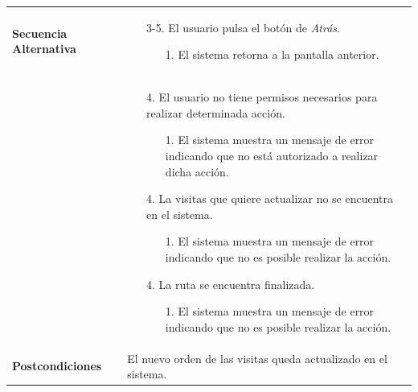 \begin{longtable}{| p{4cm} | p{10cm} |}
\\
\hline
\textbf{Secuencia Alternativa} &\mbox{}\par\vspace{-\baselineskip}
\begin{enumerate}[leftmargin=0.9cm, topsep=0.1cm]
\item[3-5.] El usuario pulsa el botón de \textit{Atrás}.
	\begin{itemize}
	\item[1.] El sistema retorna a la pantalla anterior.
	\end{itemize}
\end{enumerate}
\\ &\mbox{}\par\vspace{-\baselineskip}	
\begin{enumerate}[leftmargin=0.7cm, topsep=0.1cm]
\item[4.] El usuario no tiene permisos necesarios para realizar determinada acción.
	\begin{itemize}
	\item[1.] El sistema muestra un mensaje de error indicando que no está autorizado a realizar dicha acción.
	\end{itemize}
\item[4.] La visitas que quiere actualizar no se encuentra en el sistema.
	\begin{itemize}
	\item[1.] El sistema muestra un mensaje de error indicando que no es posible realizar la acción.
	\end{itemize}
\item[4.] La ruta se encuentra finalizada.
	\begin{itemize}
	\item[1.] El sistema muestra un mensaje de error indicando que no es posible realizar la acción.
	\end{itemize}
\end{enumerate}
\\

\hline
\textbf{Postcondiciones} & 
El nuevo orden de las visitas queda actualizado en el sistema.\\
\hline
\end{longtable}



\newpage
